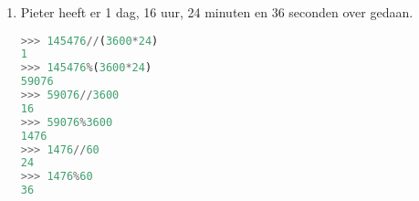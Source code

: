 \begin{enumerate}
\item Pieter heeft er 1 dag, 16 uur, 24 minuten en 36 seconden over gedaan.
\begin{lstlisting}[language=Python]
>>> 145476//(3600*24)
1
>>> 145476%(3600*24)
59076
>>> 59076//3600
16
>>> 59076%3600
1476
>>> 1476//60
24
>>> 1476%60
36
\end{lstlisting}
\end{enumerate}
